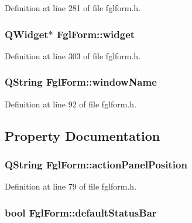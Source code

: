 Definition at line 281 of file fglform.h.

\hypertarget{classFglForm_a15cd139d56b40da6de43a6bb4d438c0d}{
\subsubsection[{widget}]{\setlength{\rightskip}{0pt plus 5cm}QWidget$\ast$ {\bf FglForm::widget}}}
\label{classFglForm_a15cd139d56b40da6de43a6bb4d438c0d}


Definition at line 303 of file fglform.h.

\hypertarget{classFglForm_a154084978ed81b8739db7197541881f5}{
\subsubsection[{windowName}]{\setlength{\rightskip}{0pt plus 5cm}QString {\bf FglForm::windowName}}}
\label{classFglForm_a154084978ed81b8739db7197541881f5}


Definition at line 92 of file fglform.h.



\subsection{Property Documentation}
\hypertarget{classFglForm_a8ca117823135914a8977974b455372a1}{
\subsubsection[{actionPanelPosition}]{\setlength{\rightskip}{0pt plus 5cm}QString FglForm::actionPanelPosition}}
\label{classFglForm_a8ca117823135914a8977974b455372a1}


Definition at line 79 of file fglform.h.

\hypertarget{classFglForm_aed179664fb0f0999affabd3b746edae7}{
\subsubsection[{defaultStatusBar}]{\setlength{\rightskip}{0pt plus 5cm}bool FglForm::defaultStatusBar}}
\label{classFglForm_aed179664fb0f0999affabd3b746edae7}


